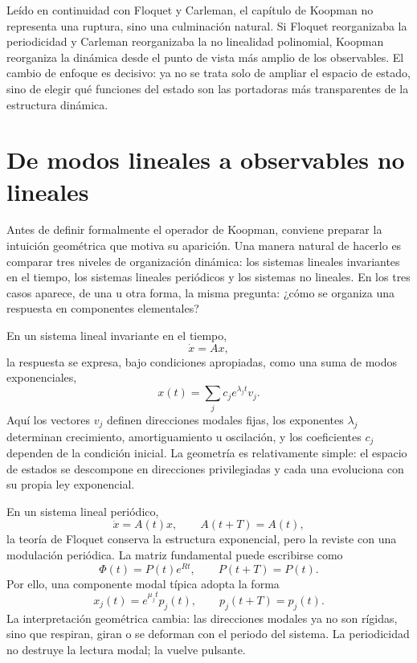 Leído en continuidad con Floquet y Carleman, el capítulo de Koopman no representa una ruptura, sino una culminación natural. Si Floquet reorganizaba la periodicidad y Carleman reorganizaba la no linealidad polinomial, Koopman reorganiza la dinámica desde el punto de vista más amplio de los observables. El cambio de enfoque es decisivo: ya no se trata solo de ampliar el espacio de estado, sino de elegir qué funciones del estado son las portadoras más transparentes de la estructura dinámica.


\section{De modos lineales a observables no lineales}

Antes de definir formalmente el operador de Koopman, conviene preparar la intuición geométrica que motiva su aparición. Una manera natural de hacerlo es comparar tres niveles de organización dinámica: los sistemas lineales invariantes en el tiempo, los sistemas lineales periódicos y los sistemas no lineales. En los tres casos aparece, de una u otra forma, la misma pregunta: ¿cómo se organiza una respuesta en componentes elementales?

En un sistema lineal invariante en el tiempo,
\begin{equation}
\dot{x}=Ax,
\label{eq:Koopman_LTI_intro_system}
\end{equation}
la respuesta se expresa, bajo condiciones apropiadas, como una suma de modos exponenciales,
\begin{equation}
x(t)=\sum_j c_j e^{\lambda_j t}v_j.
\label{eq:Koopman_LTI_intro_modes}
\end{equation}
Aquí los vectores \(v_j\) definen direcciones modales fijas, los exponentes \(\lambda_j\) determinan crecimiento, amortiguamiento u oscilación, y los coeficientes \(c_j\) dependen de la condición inicial. La geometría es relativamente simple: el espacio de estados se descompone en direcciones privilegiadas y cada una evoluciona con su propia ley exponencial.

En un sistema lineal periódico,
\begin{equation}
\dot{x}=A(t)x, \qquad A(t+T)=A(t),
\label{eq:Koopman_LTP_intro_system}
\end{equation}
la teoría de Floquet conserva la estructura exponencial, pero la reviste con una modulación periódica. La matriz fundamental puede escribirse como
\begin{equation}
\Phi(t)=P(t)e^{Rt},
\qquad P(t+T)=P(t).
\label{eq:Koopman_LTP_intro_floquet}
\end{equation}
Por ello, una componente modal típica adopta la forma
\begin{equation}
x_j(t)=e^{\mu_j t}p_j(t),
\qquad p_j(t+T)=p_j(t).
\label{eq:Koopman_LTP_intro_mode}
\end{equation}
La interpretación geométrica cambia: las direcciones modales ya no son rígidas, sino que respiran, giran o se deforman con el periodo del sistema. La periodicidad no destruye la lectura modal; la vuelve pulsante.

